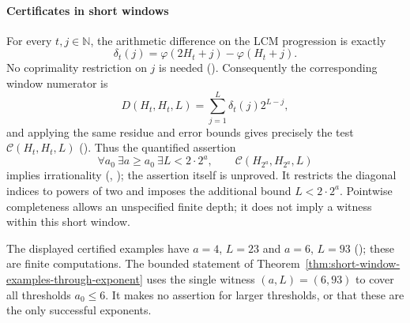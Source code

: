 \paragraph{Certificates in short windows}
For every $t,j\in\mathbb N$, the arithmetic difference on the LCM
progression is exactly
\[
 \delta_t(j)=\varphi(2H_t+j)-\varphi(H_t+j).
\]
No coprimality restriction on $j$ is needed
(). Consequently the corresponding window
numerator is
\[
 D(H_t,H_t,L)=\sum_{j=1}^{L}\delta_t(j)2^{L-j},
\]
and applying the same residue and error bounds gives precisely the
test $\mathcal C(H_t,H_t,L)$ ().
Thus the quantified assertion
\[
 \forall a_0\ \exists a\ge a_0\ \exists L<2\cdot2^a,
 \qquad\mathcal C(H_{2^a},H_{2^a},L)
\]
implies irrationality
(,
);
the assertion itself is unproved.
It restricts the diagonal indices to powers of two and imposes the
additional bound $L<2\cdot2^a$. Pointwise completeness allows an
unspecified finite depth; it does not imply a witness within this
short window.

The displayed certified examples have $a=4$, $L=23$ and $a=6$, $L=93$
();
these are finite computations.
The bounded statement of
Theorem~\ref{thm:short-window-examples-through-exponent} uses the single
witness $(a,L)=(6,93)$
to cover all thresholds $a_0\le6$. It makes no assertion for larger
thresholds, or that these are the only successful exponents.


